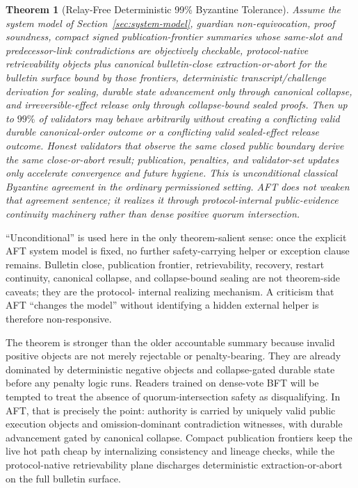 \documentclass[11pt]{article}
\newtheorem{theorem}{Theorem}
\newcommand{\AFT}{\textsc{AFT}}
\begin{document}
\begin{theorem}[Relay-Free Deterministic 99\% Byzantine Tolerance]
Assume the system model of Section~\ref{sec:system-model}, guardian
non-equivocation, proof soundness, compact signed publication-frontier
summaries whose same-slot and predecessor-link contradictions are objectively
checkable, protocol-native retrievability objects plus canonical
bulletin-close extraction-or-abort for the bulletin surface bound by those
frontiers,
deterministic transcript/challenge derivation for sealing, durable state
advancement only through canonical collapse, and irreversible-effect release
only through collapse-bound sealed proofs. Then up to \(99\%\) of validators
may behave arbitrarily without creating a conflicting valid durable
canonical-order outcome or a conflicting valid sealed-effect release outcome.
Honest validators that observe the same closed public boundary derive the same
close-or-abort result; publication, penalties, and validator-set updates only
accelerate convergence and future hygiene. This is unconditional classical
Byzantine agreement in the ordinary permissioned setting. \AFT{} does not
weaken that agreement sentence; it realizes it through protocol-internal
public-evidence continuity machinery rather than dense positive quorum
intersection.
\end{theorem}

``Unconditional'' is used here in the only theorem-salient sense: once the
explicit \AFT{} system model is fixed, no further safety-carrying helper or
exception clause remains. Bulletin close, publication frontier,
retrievability, recovery, restart continuity, canonical collapse, and
collapse-bound sealing are not theorem-side caveats; they are the protocol-
internal realizing mechanism. A criticism that \AFT{} ``changes the model''
without identifying a hidden external helper is therefore non-responsive.

The theorem is stronger than the older accountable summary because
invalid positive objects are not merely rejectable or penalty-bearing. They are
already dominated by deterministic negative objects and collapse-gated durable
state before any penalty logic runs.
Readers trained on dense-vote BFT will be tempted to treat the absence of
quorum-intersection safety as disqualifying. In \AFT{}, that is precisely the
point: authority is carried by uniquely valid public execution objects and
omission-dominant contradiction witnesses, with durable advancement gated by
canonical collapse.
Compact publication frontiers keep the live hot path cheap by internalizing
consistency and lineage checks, while the protocol-native retrievability plane
discharges deterministic extraction-or-abort on the full bulletin surface.
\end{document}
